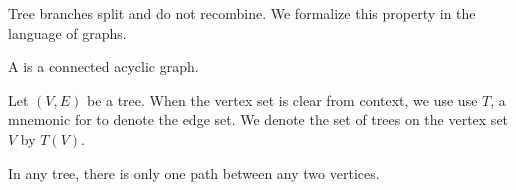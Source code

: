 \sbasic


\sstart



Tree branches split
and do not recombine.
We formalize this
property in the
language of graphs.


A
is a
connected
acyclic graph.


Let $(V, E)$ be a tree.
When the vertex set is clear
from context, we use
use $T$, a mnemonic for 
to denote the edge set.
We denote the set of trees
on the vertex set $V$ by
$T(V)$.


\begin{prop}
  In any tree,
  there is only one
  path between
  any two vertices.
\end{prop}

\strats
